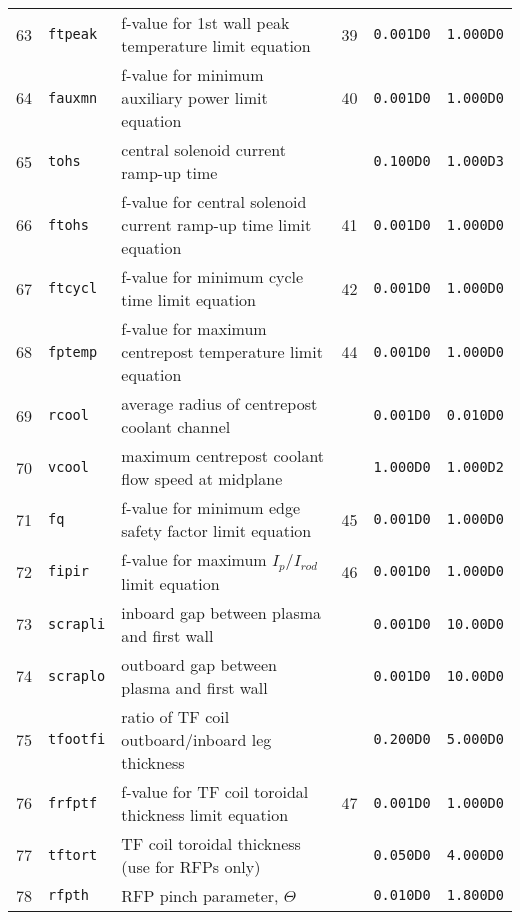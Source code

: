 \documentclass[11pt,a4paper]{report}
\begin{document}
\begin{table}[tbph]
\begin{center}
\begin{tabular}{||c|l|l|c|c|c||}
63  & \texttt{ftpeak}   & f-value for 1st wall peak temperature limit equation    & 39  & \texttt{0.001D0} & \texttt{1.000D0} \\
64  & \texttt{fauxmn}   & f-value for minimum auxiliary power limit equation      & 40  & \texttt{0.001D0} & \texttt{1.000D0} \\
65  & \texttt{tohs}     & central solenoid current ramp-up time                   &     & \texttt{0.100D0} & \texttt{1.000D3} \\
66  & \texttt{ftohs}    & f-value for central solenoid current ramp-up time limit equation & 41  & \texttt{0.001D0} & \texttt{1.000D0} \\
67  & \texttt{ftcycl}   & f-value for minimum cycle time limit equation           & 42  & \texttt{0.001D0} & \texttt{1.000D0} \\
68  & \texttt{fptemp}   & f-value for maximum centrepost temperature limit equation & 44  & \texttt{0.001D0} & \texttt{1.000D0} \\
69  & \texttt{rcool}    & average radius of centrepost coolant channel            &     & \texttt{0.001D0} & \texttt{0.010D0} \\
70  & \texttt{vcool}    & maximum centrepost coolant flow speed at midplane       &     & \texttt{1.000D0} & \texttt{1.000D2} \\
71  & \texttt{fq}       & f-value for minimum edge safety factor limit equation   & 45  & \texttt{0.001D0} & \texttt{1.000D0} \\
72  & \texttt{fipir}    & f-value for maximum $I_p/I_{rod}$ limit equation         & 46  & \texttt{0.001D0} & \texttt{1.000D0} \\
73  & \texttt{scrapli}  & inboard gap between plasma and first wall               &     & \texttt{0.001D0} & \texttt{10.00D0} \\
74  & \texttt{scraplo}  & outboard gap between plasma and first wall              &     & \texttt{0.001D0} & \texttt{10.00D0} \\
75  & \texttt{tfootfi}  & ratio of TF coil outboard/inboard leg thickness         &     & \texttt{0.200D0} & \texttt{5.000D0} \\
76  & \texttt{frfptf}   & f-value for TF coil toroidal thickness limit equation   & 47  & \texttt{0.001D0} & \texttt{1.000D0} \\
77  & \texttt{tftort}   & TF coil toroidal thickness (use for RFPs only)          &     & \texttt{0.050D0} & \texttt{4.000D0} \\
78  & \texttt{rfpth}    & RFP pinch parameter, $\Theta$                           &     & \texttt{0.010D0} & \texttt{1.800D0} \\

\end{tabular}
\end{center}
\end{table}
\end{document}
